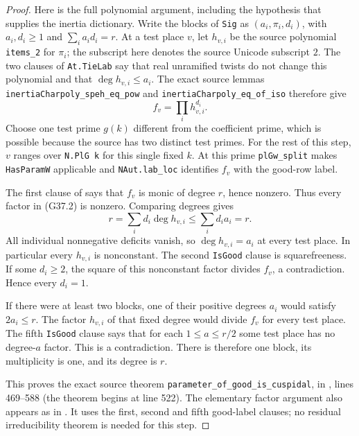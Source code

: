 \begin{proof}
Here is the full polynomial argument, including the hypothesis
that supplies the inertia dictionary.  Write the blocks of
\texttt{Sig} as $(a_i,\pi_i,d_i)$, with $a_i,d_i\ge1$ and
$\sum_i a_id_i=r$.  At a test place $v$, let $h_{v,i}$ be the
source polynomial \texttt{items\_2} for $\pi_i$; the subscript
here denotes the source Unicode subscript $2$.
The two clauses of \texttt{At.TieLab} say that real unramified
twists do not change this polynomial and that
$\deg h_{v,i}\le a_i$.
The exact source lemmas
\texttt{inertiaCharpoly\_speh\_eq\_pow} and
\texttt{inertiaCharpoly\_eq\_of\_iso} therefore give
\[
                    f_v=\prod_i h_{v,i}^{d_i}.        \tag{G37.2}
\]
Choose one test prime $g(k)$ different from the coefficient prime,
which is possible because the source has two distinct test primes.
For the rest of this step, $v$ ranges over \texttt{N.PlG k}
for this single fixed $k$.  At this prime
\texttt{plGw\_split} makes \texttt{HasParamW} applicable and
\texttt{NAut.lab\_loc} identifies $f_v$ with the good-row label.

The first clause of  says that
$f_v$ is monic of degree $r$, hence nonzero.  Thus every factor
in (G37.2) is nonzero.  Comparing degrees gives
\[
 r=\sum_i d_i\deg h_{v,i}\le\sum_i d_i a_i=r.
\]
All individual nonnegative deficits vanish, so
$\deg h_{v,i}=a_i$ at every test place.  In particular every
$h_{v,i}$ is nonconstant.  The second \texttt{IsGood} clause
is squarefreeness.  If some $d_i\ge2$, the square of this
nonconstant factor divides $f_v$, a contradiction.  Hence
every $d_i=1$.

If there were at least two blocks, one of their positive
degrees $a_i$ would satisfy $2a_i\le r$.  The factor
$h_{v,i}$ of that fixed degree would divide $f_v$ for every
test place.  The fifth \texttt{IsGood} clause says that for
each $1\le a\le r/2$ some test place has no degree-$a$
factor.  This is a contradiction.  There is therefore one
block, its multiplicity is one, and its degree is $r$.

This proves the exact source theorem
\texttt{parameter\_of\_good\_is\_cuspidal}, in
,
lines 469--588 (the theorem begins at line 522).
The elementary factor argument also appears as
in .
It uses the first, second and fifth good-label clauses;
no residual irreducibility theorem is needed for this step.


\end{proof}

